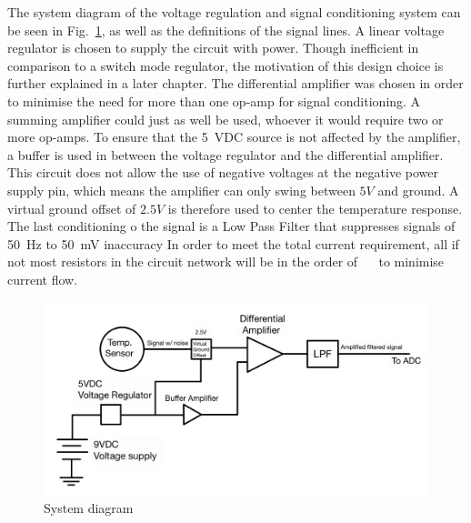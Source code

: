 The system diagram of the voltage regulation and signal conditioning system can be seen in Fig.\ \ref{fig:system_diagram}, as well as the definitions of the signal lines.\newline
 A linear voltage regulator is chosen to supply the circuit with power. Though inefficient in comparison to a switch mode regulator, the motivation of this design choice is further explained in a later chapter. The differential amplifier was chosen in order to minimise the need for more than one op-amp for signal conditioning. A summing amplifier could just as well be used, whoever it would require two or more op-amps.  To ensure that the \SI{5}{VDC} source is not affected by the amplifier, a buffer is used in between the voltage regulator and the differential amplifier. This circuit does not allow the use of negative voltages at the negative power supply pin, which means the amplifier can only swing  between $5V$ and ground. A virtual ground offset of $2.5V$ is therefore used to center the temperature response. The last conditioning o the signal is a Low Pass Filter that suppresses signals of \SI{50}{\Hz} to \SI{50}{\milli\V} inaccuracy In order to meet the total current requirement, all if not most resistors in the circuit network will be in the order of \SI{}{\kilo\Omega} to minimise current flow.
 \newline
\begin{figure}
    \centering
    \includegraphics[width = 0.8\linewidth]{Figures/Pictures/SystemDiagram.png}
    \caption{System diagram}
    \label{fig:system_diagram}
\end{figure}

\vfill










